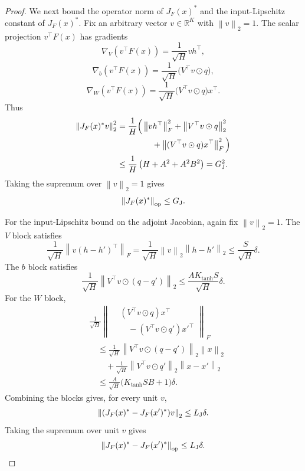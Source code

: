 \documentclass[11pt,a4paper]{report}
\theoremstyle{plain}
\theoremstyle{definition}
\theoremstyle{remark}
\newcommand{\R}{\mathbb{R}}
\newcommand{\op}{\mathrm{op}}
\newcommand{\norm}[1]{\left\lVert #1\right\rVert}
\begin{document}
\begin{proof}
We next bound the operator norm of $J_F(x)^\ast$ and the input-Lipschitz
constant of $J_F(x)^\ast$.  Fix an arbitrary vector $v\in\R^K$ with
$\norm{v}_2=1$.  The scalar projection $v^\top F(x)$ has gradients
\[
\nabla_V(v^\top F(x))=\frac1{\sqrt H}vh^\top,
\]
\[
\nabla_b(v^\top F(x))=\frac1{\sqrt H}\bigl(V^\top v\odot q\bigr),
\]
\[
\nabla_W(v^\top F(x))=
\frac1{\sqrt H}\bigl(V^\top v\odot q\bigr)x^\top.
\]
Thus
\begin{align*}
\norm{J_F(x)^\ast v}_2^2
&=
\frac1H\Big(
\norm{vh^\top}_F^2
+
\norm{V^\top v\odot q}_2^2\\
&\hspace{15mm}+
\norm{(V^\top v\odot q)x^\top}_F^2
\Big)\\
&\le
\frac1H\left(H+A^2+A^2B^2\right)
=
G_{\rm J}^2.
\end{align*}
Taking the supremum over $\norm{v}_2=1$ gives
\begin{equation}
\label{eq:mc-J-operator-bound}
\norm{J_F(x)^\ast}_{\op}\le G_{\rm J}.
\end{equation}

For the input-Lipschitz bound on the adjoint Jacobian, again fix
$\norm{v}_2=1$.  The $V$ block satisfies
\[
\frac1{\sqrt H}\norm{v(h-h')^\top}_F
=
\frac1{\sqrt H}\norm{v}_2\norm{h-h'}_2
\le
\frac S{\sqrt H}\delta.
\]
The $b$ block satisfies
\[
\frac1{\sqrt H}\norm{V^\top v\odot(q-q')}_2
\le
\frac{AK_{\tanh}S}{\sqrt H}\delta.
\]
For the $W$ block,
\begin{align*}
&\frac1{\sqrt H}
\left\|
\begin{aligned}
&(V^\top v\odot q)x^\top\\
&\quad-(V^\top v\odot q')x'^\top
\end{aligned}
\right\|_F\\
&\quad\le
\frac1{\sqrt H}\norm{V^\top v\odot(q-q')}_2\norm{x}_2\\
&\qquad+
\frac1{\sqrt H}\norm{V^\top v\odot q'}_2\norm{x-x'}_2\\
&\quad\le
\frac{A}{\sqrt H}\bigl(K_{\tanh}SB+1\bigr)\delta.
\end{align*}
Combining the blocks gives, for every unit $v$,
\[
\norm{(J_F(x)^\ast-J_F(x')^\ast)v}_2
\le
L_{\rm J}\delta.
\]
Taking the supremum over unit $v$ gives
\begin{equation}
\label{eq:mc-J-lipschitz}
\norm{J_F(x)^\ast-J_F(x')^\ast}_{\op}
\le
L_{\rm J}\delta.
\end{equation}


\end{proof}
\end{document}
